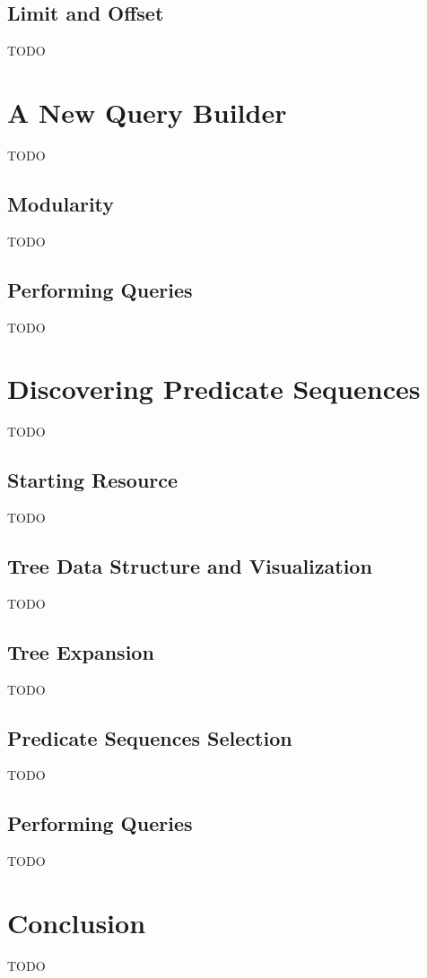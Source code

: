 \subsection{Limit and Offset}

TODO



\section{A New Query Builder}
\label{sec:new_query_builder}

TODO

\subsection{Modularity}

TODO

\subsection{Performing Queries}

TODO

\section{Discovering Predicate Sequences}
\label{sec:discovering_predicate_sequences}

TODO

\subsection{Starting Resource}

TODO

\subsection{Tree Data Structure and Visualization}

TODO

\subsection{Tree Expansion}

TODO

\subsection{Predicate Sequences Selection}

TODO

\subsection{Performing Queries}

TODO

\section{Conclusion}

TODO